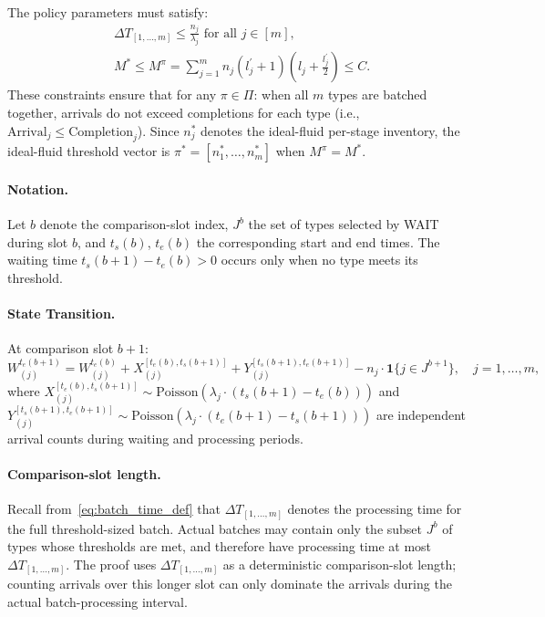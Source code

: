 The policy parameters must satisfy:
\begin{equation}\label{eq:policy_constraints}
\begin{aligned}
&\Delta T_{[1,\ldots,m]} \leq \frac{n_j}{\lambda_j} \text{ for all } j \in [m], \\
&M^{*}\leq M^{\pi} = \sum_{j=1}^mn_j(l_j^\prime+1)\left(l_j+\frac{l_j^\prime}{2}\right)\leq C.
\end{aligned}
\end{equation}
These constraints ensure that for any $\pi \in \Pi$: when all $m$ types are batched together, arrivals do not exceed completions for each type (i.e., $\text{Arrival}_j\leq \text{Completion}_j$). Since \(n_j^*\) denotes the ideal-fluid per-stage inventory, the ideal-fluid threshold vector is \(\pi^* = [n_1^*,\ldots,n_m^*]\) when \(M^\pi = M^*\).

\paragraph{Notation.} Let $b$ denote the comparison-slot index, \(J^b\) the set of types selected by WAIT during slot \(b\), and \(t_s(b)\), \(t_e(b)\) the corresponding start and end times. The waiting time $t_s(b+1)-t_e(b)>0$ occurs only when no type meets its threshold.

\paragraph{State Transition.} At comparison slot $b+1$:
$$W_{(j)}^{t_e(b+1)}=W_{(j)}^{t_e(b)}+X_{(j)}^{[t_e(b), t_s(b+1)]}+Y_{(j)}^{[t_s(b+1), t_e(b+1)]}- n_j\cdot \mathbf{1}\{j\in J^{b+1}\},\quad j=1,\ldots,m,$$
where $X_{(j)}^{[t_e(b), t_s(b+1)]} \sim \text{Poisson}(\lambda_j \cdot (t_s(b+1)-t_e(b)))$ and $Y_{(j)}^{[t_s(b+1), t_e(b+1)]} \sim \text{Poisson}(\lambda_j \cdot (t_e(b+1)-t_s(b+1)))$ are independent arrival counts during waiting and processing periods.

\paragraph{Comparison-slot length.} Recall from~\eqref{eq:batch_time_def} that $\Delta T_{[1,\ldots,m]}$ denotes the processing time for the full threshold-sized batch. Actual batches may contain only the subset \(J^b\) of types whose thresholds are met, and therefore have processing time at most \(\Delta T_{[1,\ldots,m]}\). The proof uses \(\Delta T_{[1,\ldots,m]}\) as a deterministic comparison-slot length; counting arrivals over this longer slot can only dominate the arrivals during the actual batch-processing interval.

